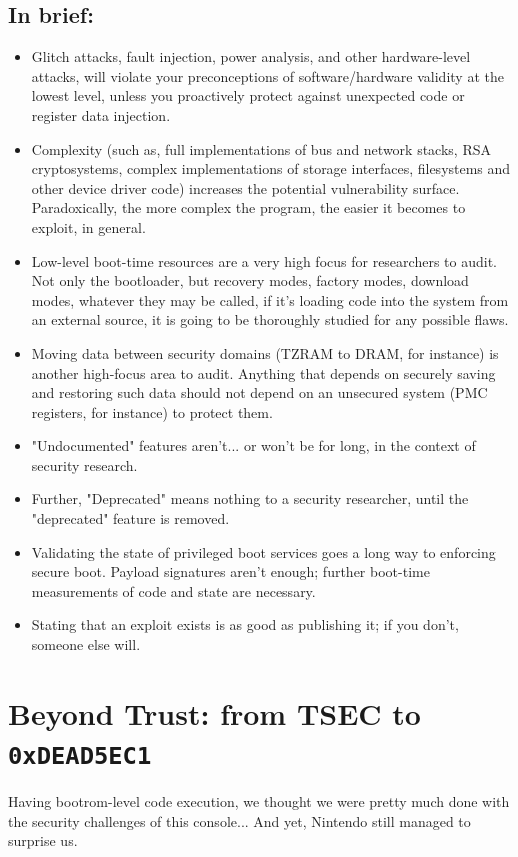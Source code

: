 \documentclass[journal]{IEEEtran}
\begin{document}
\subsection*{In brief:}
\begin{itemize}
\item Glitch attacks, fault injection, power analysis, and other hardware-level attacks, will
violate your preconceptions of software/hardware validity at the lowest level, unless you
proactively protect against unexpected code or register data injection.
\item Complexity (such as, full implementations of bus and network stacks, RSA cryptosystems,
complex implementations of storage interfaces, filesystems and other device driver code) increases
the potential vulnerability surface. Paradoxically, the more complex the program, the easier it
becomes to exploit, in general.
\item Low-level boot-time resources are a very high focus for researchers to audit. Not only the
bootloader, but recovery modes, factory modes, download modes, whatever they may be called, if it's
loading code into the system from an external source, it is going to be thoroughly studied for any
possible flaws.
\item Moving data between security domains (TZRAM to DRAM, for instance) is another high-focus area
to audit. Anything that depends on securely saving and restoring such data should not depend on an
unsecured system (PMC registers, for instance) to protect them.
\item "Undocumented" features aren't... or won't be for long, in the context of security research.
\item Further, "Deprecated" means nothing to a security researcher, until the "deprecated" feature
is removed.
\item Validating the state of privileged boot services goes a long way to enforcing secure boot.
Payload signatures aren't enough; further boot-time measurements of code and state are necessary.
\item Stating that an exploit exists is as good as publishing it; if you don't, someone else will.
\end{itemize}


\section{Beyond Trust: from TSEC to \texttt{0xDEAD5EC1}}

Having bootrom-level code execution, we thought we were pretty much done with the security
challenges of this console... And yet, Nintendo still managed to surprise us.
\end{document}
